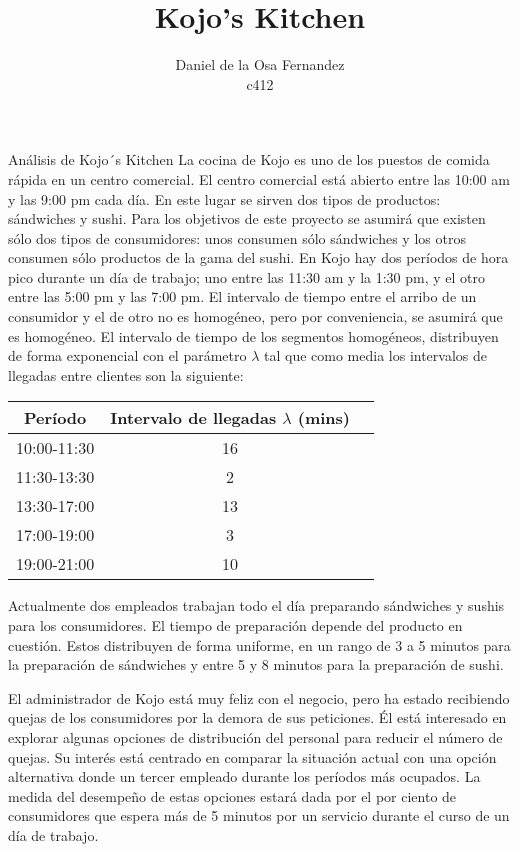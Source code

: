 \documentclass[]{article}
\title{Kojo's Kitchen}
\author{Daniel de la Osa Fernandez\\ c412}
\begin{document}
\maketitle



\begin{section} {An\'{a}lisis de Kojo´s Kitchen}
La cocina de Kojo es uno de los puestos de comida r\'{a}pida en un centro comercial. El centro comercial está abierto entre las 10:00 am y las 9:00 pm cada d\'{i}a. En este lugar se sirven dos tipos de productos: s\'{a}ndwiches y sushi. Para los objetivos de este proyecto se asumir\'{a} que existen s\'{o}lo dos tipos de consumidores: unos consumen s\'{o}lo s\'{a}ndwiches y los otros consumen s\'{o}lo productos de la gama del sushi. En Kojo hay dos per\'{i}odos de hora pico durante un d\'{i}a de trabajo; uno entre las 11:30 am y la 1:30 pm, y el otro entre las 5:00 pm y las 7:00 pm. El intervalo de tiempo entre el arribo de un consumidor y el de otro no es homog\'{e}neo, pero por conveniencia, se asumir\'{a} que es homog\'{e}neo. El intervalo de tiempo de los segmentos homog\'{e}neos, distribuyen de forma exponencial con el par\'{a}metro $\lambda$ tal que como media los intervalos de llegadas entre clientes son la siguiente: 

\begin{center}
	\begin{tabular}{|c|c|c|} \hline
		Per\'{i}odo 	&  Intervalo de llegadas   $\lambda$ (mins)	 \\ \hline
		10:00-11:30 	& 16	 						\\ \hline
		11:30-13:30 	& 2								\\ \hline	
		13:30-17:00 	& 13							\\ \hline
		17:00-19:00 	& 3		 						\\ \hline 	
		19:00-21:00		& 10	 						\\ \hline 
	\end{tabular}
\end{center}

Actualmente dos empleados trabajan todo el d\'{i}a preparando s\'{a}ndwiches y sushis para los consumidores. El tiempo de preparaci\'{o}n depende del producto en cuesti\'{o}n. Estos distribuyen de forma uniforme, en un rango de 3 a 5 minutos para la preparaci\'{o}n de s\'{a}ndwiches y entre 5 y 8 minutos para la preparaci\'{o}n de sushi.

El administrador de Kojo est\'{a} muy feliz con el negocio, pero ha estado recibiendo quejas de los consumidores por la demora de sus peticiones. \'{E}l est\'{a} interesado en explorar algunas opciones de distribución del personal para reducir el número de quejas. Su inter\'{e}s est\'{a} centrado en comparar la situaci\'{o}n actual con una opci\'{o}n alternativa donde un tercer empleado durante los per\'{i}odos m\'{a}s ocupados. La medida del desempe\~{n}o de estas opciones estar\'{a} dada por el por ciento de consumidores que espera m\'{a}s de 5 minutos por un servicio durante el curso de un d\'{i}a de trabajo. 

\end{section}
\end{document}
